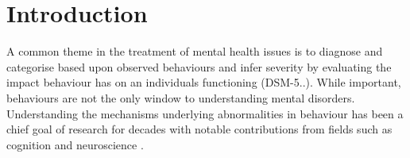 \section{Introduction}

A common theme in the treatment of mental health issues is to diagnose and categorise based upon observed behaviours and infer severity by evaluating the impact behaviour has on an individuals functioning (DSM-5..). While important, behaviours are not the only window to understanding mental disorders. Understanding the mechanisms underlying abnormalities in behaviour has been a chief goal of research for decades with notable contributions from fields such as cognition and neuroscience \cite{Frank_2015}. 